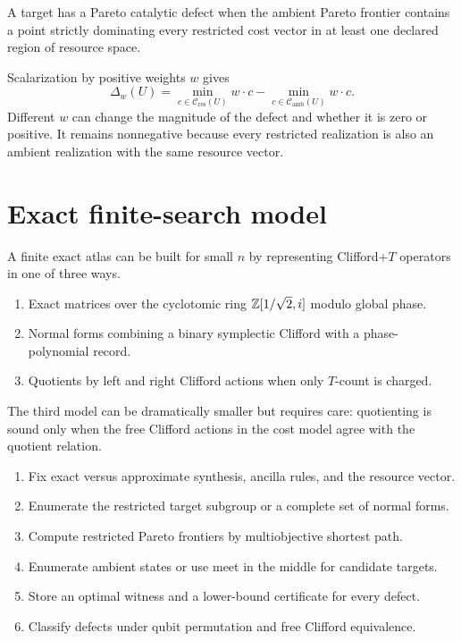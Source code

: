 \begin{definition}
A target has a Pareto catalytic defect when the ambient Pareto frontier contains a point strictly dominating every restricted cost vector in at least one declared region of resource space.
\end{definition}

Scalarization by positive weights $w$ gives
\[
\Delta_w(U)=
\min_{c\in\mathcal C_{\mathrm{res}}(U)}w\cdot c
-
\min_{c\in\mathcal C_{\mathrm{amb}}(U)}w\cdot c.
\]
Different $w$ can change the magnitude of the defect and whether it is zero or positive.  It remains nonnegative because every restricted realization is also an ambient realization with the same resource vector.

\section{Exact finite-search model}
A finite exact atlas can be built \cite{KliuchnikovEtAl2013,AmyEtAl2013} for small $n$ by representing Clifford+$T$ operators in one of three ways.
\begin{enumerate}
\item Exact matrices over the cyclotomic ring $\mathbb Z[1/\sqrt2,i]$ modulo global phase.
\item Normal forms combining a binary symplectic Clifford with a phase-polynomial record.
\item Quotients by left and right Clifford actions when only $T$-count is charged.
\end{enumerate}
The third model can be dramatically smaller but requires care: quotienting is sound only when the free Clifford actions in the cost model agree with the quotient relation.

\begin{protocol}
\begin{enumerate}
\item Fix exact versus approximate synthesis, ancilla rules, and the resource vector.
\item Enumerate the restricted target subgroup or a complete set of normal forms.
\item Compute restricted Pareto frontiers by multiobjective shortest path.
\item Enumerate ambient states or use meet in the middle for candidate targets.
\item Store an optimal witness and a lower-bound certificate for every defect.
\item Classify defects under qubit permutation and free Clifford equivalence.
\end{enumerate}
\end{protocol}

